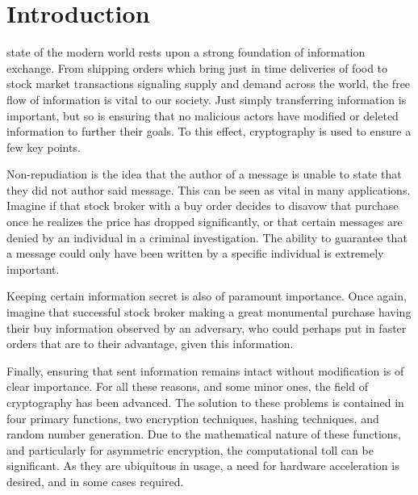\documentclass[journal]{IEEEtran}
\begin{document}
\section{Introduction}
% 
% 
% 
% 
 state of the modern world rests upon a strong foundation of information exchange.  From shipping orders which bring just in time deliveries of food to stock market transactions signaling supply and demand across the world, the free flow of information is vital to our society.  Just simply transferring information is important, but so is ensuring that no malicious actors have modified or deleted information to further their goals.  To this effect, cryptography is used to ensure a few key points.  

Non-repudiation is the idea that the author of a message is unable to state that they did not author said message.  This can be seen as vital in many applications.  Imagine if that stock broker with a buy order decides to disavow that purchase once he realizes the price has dropped significantly, or that certain messages are denied by an individual in a criminal investigation.  The ability to guarantee that a message could only have been written by a specific individual is extremely important.

Keeping certain information secret is also of paramount importance.  Once again, imagine that successful stock broker making a great monumental purchase having their buy information observed by an adversary, who could perhaps put in faster orders that are to their advantage, given this information.  

Finally, ensuring that sent information remains intact without modification is of clear importance.  For all these reasons, and some minor ones, the field of cryptography has been advanced.  The solution to these problems is contained in four primary functions, two encryption techniques, hashing techniques, and random number generation.  Due to the mathematical nature of these functions, and particularly for asymmetric encryption, the computational toll can be significant.  As they are ubiquitous in usage, a need for hardware acceleration is desired, and in some cases required.
\end{document}
